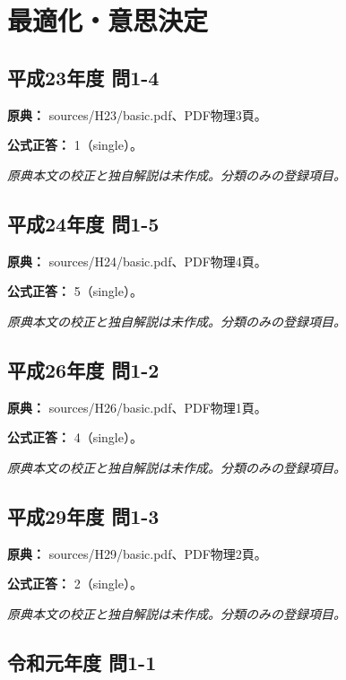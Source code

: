 \section{最適化・意思決定}

\subsection{平成23年度 問1-4}
\label{q:h23-reg-basic-1-4}

\noindent\textbf{原典：} sources/H23/basic.pdf、PDF物理3頁。

\textbf{公式正答：} 1（single）。

\par\textit{原典本文の校正と独自解説は未作成。分類のみの登録項目。}

\subsection{平成24年度 問1-5}
\label{q:h24-reg-basic-1-5}

\noindent\textbf{原典：} sources/H24/basic.pdf、PDF物理4頁。

\textbf{公式正答：} 5（single）。

\par\textit{原典本文の校正と独自解説は未作成。分類のみの登録項目。}

\subsection{平成26年度 問1-2}
\label{q:h26-reg-basic-1-2}

\noindent\textbf{原典：} sources/H26/basic.pdf、PDF物理1頁。

\textbf{公式正答：} 4（single）。

\par\textit{原典本文の校正と独自解説は未作成。分類のみの登録項目。}

\subsection{平成29年度 問1-3}
\label{q:h29-reg-basic-1-3}

\noindent\textbf{原典：} sources/H29/basic.pdf、PDF物理2頁。

\textbf{公式正答：} 2（single）。

\par\textit{原典本文の校正と独自解説は未作成。分類のみの登録項目。}

\subsection{令和元年度 問1-1}
\label{q:r01-reg-basic-1-1}


